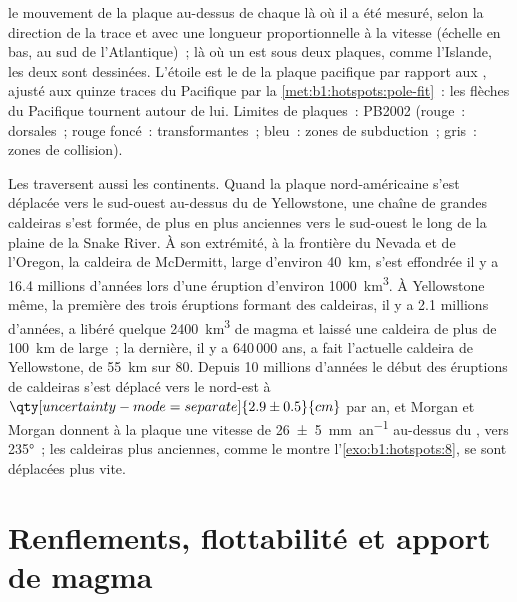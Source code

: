 \begin{omfigure}
{le mouvement de la plaque au-dessus de chaque  là où il a été mesuré, selon la
direction de la trace et avec une longueur proportionnelle à la vitesse (échelle en
bas, au sud de l'Atlantique)~; là où un  est sous deux plaques, comme l'Islande, les deux sont
dessinées. L'étoile est le  de la plaque pacifique par rapport aux
, ajusté aux quinze traces du Pacifique par la
\cref{met:b1:hotspots:pole-fit}~: les flèches du Pacifique tournent autour de lui. Limites de plaques~:
PB2002 (rouge~: dorsales~; rouge foncé~: transformantes~; bleu~: zones de subduction~;
gris~: zones de collision).}
\label{fig:b1:hotspots:map}
\end{omfigure}


Les  traversent aussi les continents. Quand la plaque nord-américaine s'est déplacée
vers le sud-ouest au-dessus du  de Yellowstone, une chaîne de grandes caldeiras s'est formée,
de plus en plus anciennes vers le sud-ouest le long de la plaine de la Snake River. À son
extrémité, à la frontière du Nevada et de l'Oregon, la caldeira de McDermitt, large d'environ
\qty{40}{km}, s'est effondrée il y a 16.4 millions d'années lors d'une éruption d'environ
\qty{1000}{km^3}. À Yellowstone même, la première des trois éruptions formant des caldeiras,
il y a 2.1 millions d'années, a libéré quelque \qty{2400}{km^3} de magma et
laissé une caldeira de plus de \qty{100}{km} de large~; la dernière, il y a 640\,000 ans,
a fait l'actuelle caldeira de Yellowstone, de \qty{55}{km} sur 80. Depuis 10 millions
d'années le début des éruptions de caldeiras s'est déplacé vers le nord-est à
$\qty[uncertainty-mode=separate]{2.9 \pm 0.5}{cm}$ par an, et Morgan et
Morgan donnent à la plaque une vitesse de
\qty[uncertainty-mode=separate]{26 \pm 5}{mm.an^{-1}} au-dessus du , vers
\ang{235}~; les caldeiras plus anciennes, comme le montre l'\cref{exo:b1:hotspots:8}, se sont déplacées
plus vite.

\section{Renflements, flottabilité et apport de magma}\label{sec:b1:hotspots:swells}

